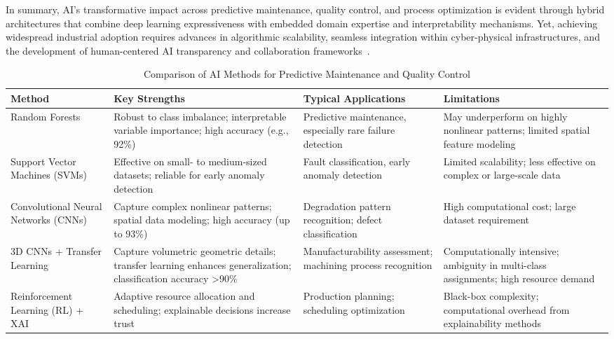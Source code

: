 \documentclass[sigconf]{acmart}
\begin{document}
In summary, AI's transformative impact across predictive maintenance, quality control, and process optimization is evident through hybrid architectures that combine deep learning expressiveness with embedded domain expertise and interpretability mechanisms. Yet, achieving widespread industrial adoption requires advances in algorithmic scalability, seamless integration within cyber-physical infrastructures, and the development of human-centered AI transparency and collaboration frameworks~\cite{ref9,ref24,ref36}.

\begin{table*}[htbp]
\centering
\caption{Comparison of AI Methods for Predictive Maintenance and Quality Control}
\label{tab:method_comparison}
\begin{adjustbox}{max width=\textwidth}
\begin{tabular}{@{}llll@{}}
\toprule
\textbf{Method} & \textbf{Key Strengths} & \textbf{Typical Applications} & \textbf{Limitations} \\
\toprule
Random Forests & Robust to class imbalance; interpretable variable importance; high accuracy (e.g., 92\%) & Predictive maintenance, especially rare failure detection & May underperform on highly nonlinear patterns; limited spatial feature modeling \\
Support Vector Machines (SVMs) & Effective on small- to medium-sized datasets; reliable for early anomaly detection & Fault classification, early anomaly detection & Limited scalability; less effective on complex or large-scale data \\
Convolutional Neural Networks (CNNs) & Capture complex nonlinear patterns; spatial data modeling; high accuracy (up to 93\%) & Degradation pattern recognition; defect classification & High computational cost; large dataset requirement \\
3D CNNs + Transfer Learning & Capture volumetric geometric details; transfer learning enhances generalization; classification accuracy >90\% & Manufacturability assessment; machining process recognition & Computationally intensive; ambiguity in multi-class assignments; high resource demand \\
Reinforcement Learning (RL) + XAI & Adaptive resource allocation and scheduling; explainable decisions increase trust & Production planning; scheduling optimization & Black-box complexity; computational overhead from explainability methods \\
\bottomrule
\end{tabular}
\end{adjustbox}
\end{table*}
\end{document}
